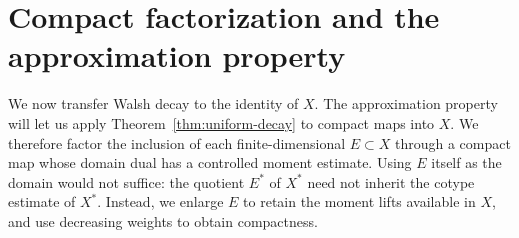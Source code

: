 \section{Compact factorization and the approximation property}
\label{sec:approximation}

We now transfer Walsh decay to the identity of \(X\).
The approximation property will let us apply Theorem~\ref{thm:uniform-decay}
to compact maps into \(X\). We therefore factor the inclusion of
each finite-dimensional \(E\subset X\) through a compact map
whose domain dual has a controlled moment estimate.
Using \(E\) itself as the domain would not suffice: the quotient
\(E^*\) of \(X^*\) need not inherit the cotype estimate of \(X^*\).
Instead, we enlarge \(E\) to retain the moment lifts available in
\(X\), and use decreasing weights to obtain compactness.

